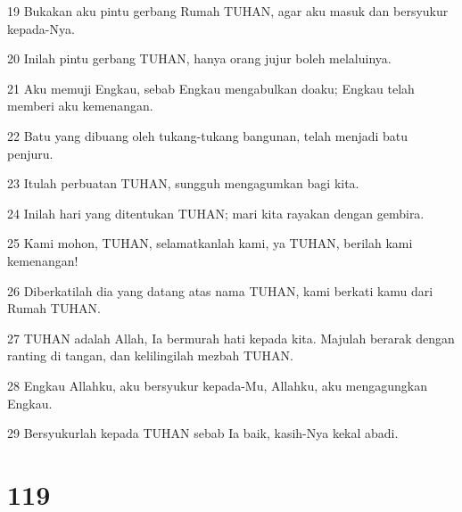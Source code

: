 \par 19 Bukakan aku pintu gerbang Rumah TUHAN, agar aku masuk dan bersyukur kepada-Nya.
\par 20 Inilah pintu gerbang TUHAN, hanya orang jujur boleh melaluinya.
\par 21 Aku memuji Engkau, sebab Engkau mengabulkan doaku; Engkau telah memberi aku kemenangan.
\par 22 Batu yang dibuang oleh tukang-tukang bangunan, telah menjadi batu penjuru.
\par 23 Itulah perbuatan TUHAN, sungguh mengagumkan bagi kita.
\par 24 Inilah hari yang ditentukan TUHAN; mari kita rayakan dengan gembira.
\par 25 Kami mohon, TUHAN, selamatkanlah kami, ya TUHAN, berilah kami kemenangan!
\par 26 Diberkatilah dia yang datang atas nama TUHAN, kami berkati kamu dari Rumah TUHAN.
\par 27 TUHAN adalah Allah, Ia bermurah hati kepada kita. Majulah berarak dengan ranting di tangan, dan kelilingilah mezbah TUHAN.
\par 28 Engkau Allahku, aku bersyukur kepada-Mu, Allahku, aku mengagungkan Engkau.
\par 29 Bersyukurlah kepada TUHAN sebab Ia baik, kasih-Nya kekal abadi.

\chapter{119}

